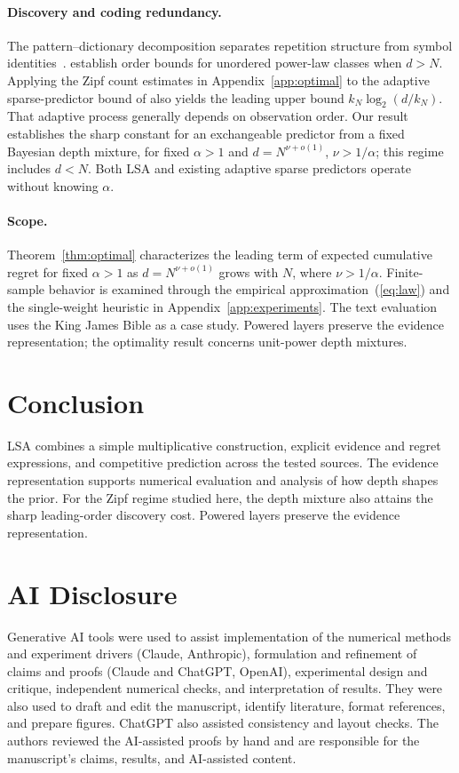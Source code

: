 \documentclass[anon]{alt2027}
\renewcommand{\eqref}[1]{(\ref{#1})}
\begin{document}
\paragraph{Discovery and coding redundancy.}
The pattern--dictionary decomposition separates repetition structure from symbol identities~\citep{orlitsky2004unknown}. \citet{falahatgar2015universal} establish order bounds for unordered power-law classes when $d>N$. Applying the Zipf count estimates in Appendix~\ref{app:optimal} to the adaptive sparse-predictor bound of \citet[Theorem~5]{hutter2013sparse} also yields the leading upper bound $k_N\log_2(d/k_N)$. That adaptive process generally depends on observation order. Our result establishes the sharp constant for an exchangeable predictor from a fixed Bayesian depth mixture, for fixed $\alpha>1$ and $d=N^{\nu+o(1)}$, $\nu>1/\alpha$; this regime includes $d<N$. Both LSA and existing adaptive sparse predictors operate without knowing $\alpha$.

\paragraph{Scope.}
Theorem~\ref{thm:optimal} characterizes the leading term of expected cumulative regret for fixed $\alpha>1$ as $d=N^{\nu+o(1)}$ grows with $N$, where $\nu>1/\alpha$. Finite-sample behavior is examined through the empirical approximation~\eqref{eq:law} and the single-weight heuristic in Appendix~\ref{app:experiments}. The text evaluation uses the King James Bible as a case study. Powered layers preserve the evidence representation; the optimality result concerns unit-power depth mixtures.

\section{Conclusion}
LSA combines a simple multiplicative construction, explicit evidence and regret expressions, and competitive prediction across the tested sources. The evidence representation supports numerical evaluation and analysis of how depth shapes the prior. For the Zipf regime studied here, the depth mixture also attains the sharp leading-order discovery cost. Powered layers preserve the evidence representation.

\section*{AI Disclosure}
Generative AI tools were used to assist implementation of the numerical methods and experiment drivers (Claude, Anthropic), formulation and refinement of claims and proofs (Claude and ChatGPT, OpenAI), experimental design and critique, independent numerical checks, and interpretation of results. They were also used to draft and edit the manuscript, identify literature, format references, and prepare figures. ChatGPT also assisted consistency and layout checks. The authors reviewed the AI-assisted proofs by hand and are responsible for the manuscript's claims, results, and AI-assisted content.
\end{document}
